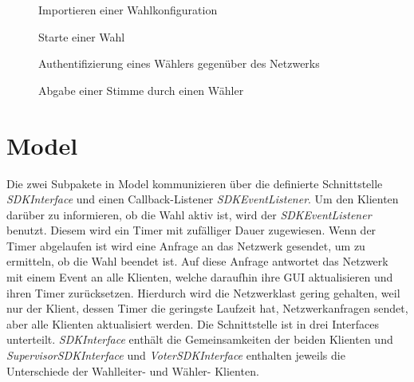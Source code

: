 \documentclass[parskip=full]{scrartcl}
\newcommand{\textitx}[1]{\mbox{\textit{#1}}}
\begin{document}
	\newpage
	\begin{figure}
		\centering
		\hspace{-100pt}
		\centerline{}
		\caption{Importieren einer Wahlkonfiguration}
		\label{fig:config_import}
	\end{figure}

	\newpage
	\begin{figure}
		\centering
		\hspace{-100pt}
		\centerline{}
		\caption{Starte einer Wahl}
		\label{fig:start_election}
	\end{figure}

	\newpage
	\begin{figure}
		\centering
		\hspace{-100pt}
		\centerline{}
		\caption{Authentifizierung eines Wählers gegenüber des Netzwerks}
		\label{fig:voter_auth}
	\end{figure}

	\newpage
	\begin{figure}
		\centering
		\hspace{-100pt}
		\centerline{}
		\caption{Abgabe einer Stimme durch einen Wähler}
		\label{fig:vote_sequence}
	\end{figure}

	\newpage
	\section{Model}
	\pagestyle{plain}
	Die zwei Subpakete in Model kommunizieren über die definierte Schnittstelle \textitx{SDKInterface} und einen Callback-Listener \textitx{SDKEventListener}. 
	Um den Klienten darüber zu informieren, ob die Wahl aktiv ist, wird der \textitx{SDKEventListener} benutzt. Diesem wird ein Timer mit zufälliger Dauer zugewiesen. Wenn der Timer abgelaufen ist wird eine Anfrage an das Netzwerk gesendet, um zu ermitteln, ob die Wahl beendet ist. Auf diese Anfrage antwortet das Netzwerk mit einem Event an alle Klienten, welche daraufhin ihre GUI aktualisieren und ihren Timer zurücksetzen. Hierdurch wird die Netzwerklast gering gehalten, weil nur der Klient, dessen Timer die geringste Laufzeit hat, Netzwerkanfragen sendet, aber alle Klienten aktualisiert werden.
	Die Schnittstelle ist in drei Interfaces unterteilt. \textitx{SDKInterface} enthält die Gemeinsamkeiten der beiden Klienten und \textitx{SupervisorSDKInterface} und \textitx{VoterSDKInterface} enthalten jeweils die Unterschiede der Wahlleiter- und Wähler- Klienten.
\end{document}
